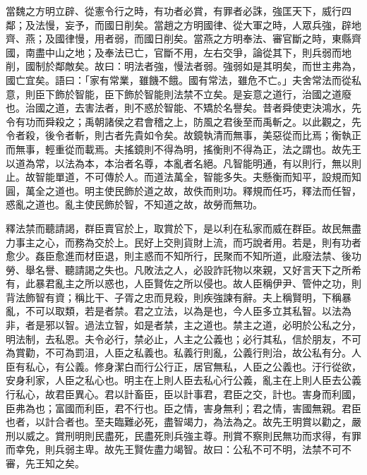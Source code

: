 \begin{pinyinscope}
當魏之方明立辟、從憲令行之時，有功者必賞，有罪者必誅，強匡天下，威行四鄰；及法慢，妄予，而國日削矣。當趙之方明國律、從大軍之時，人眾兵強，辟地齊、燕；及國律慢，用者弱，而國日削矣。當燕之方明奉法、審官斷之時，東縣齊國，南盡中山之地；及奉法已亡，官斷不用，左右交爭，論從其下，則兵弱而地削，國制於鄰敵矣。故曰：明法者強，慢法者弱。強弱如是其明矣，而世主弗為，國亡宜矣。語曰：「家有常業，雖饑不餓。國有常法，雖危不亡。」夫舍常法而從私意，則臣下飾於智能，臣下飾於智能則法禁不立矣。是妄意之道行，治國之道廢也。治國之道，去害法者，則不惑於智能、不矯於名譽矣。昔者舜使吏決鴻水，先令有功而舜殺之；禹朝諸侯之君會稽之上，防風之君後至而禹斬之。以此觀之，先令者殺，後令者斬，則古者先貴如令矣。故鏡執清而無事，美惡從而比焉；衡執正而無事，輕重從而載焉。夫搖鏡則不得為明，搖衡則不得為正，法之謂也。故先王以道為常，以法為本，本治者名尊，本亂者名絕。凡智能明通，有以則行，無以則止。故智能單道，不可傳於人。而道法萬全，智能多失。夫懸衡而知平，設規而知圓，萬全之道也。明主使民飾於道之故，故佚而則功。釋規而任巧，釋法而任智，惑亂之道也。亂主使民飾於智，不知道之故，故勞而無功。

釋法禁而聽請謁，群臣賣官於上，取賞於下，是以利在私家而威在群臣。故民無盡力事主之心，而務為交於上。民好上交則貨財上流，而巧說者用。若是，則有功者愈少。姦臣愈進而材臣退，則主惑而不知所行，民聚而不知所道，此廢法禁、後功勞、舉名譽、聽請謁之失也。凡敗法之人，必設詐託物以來親，又好言天下之所希有，此暴君亂主之所以惑也，人臣賢佐之所以侵也。故人臣稱伊尹、管仲之功，則背法飾智有資；稱比干、子胥之忠而見殺，則疾強諫有辭。夫上稱賢明，下稱暴亂，不可以取類，若是者禁。君之立法，以為是也，今人臣多立其私智。以法為非，者是邪以智。過法立智，如是者禁，主之道也。禁主之道，必明於公私之分，明法制，去私恩。夫令必行，禁必止，人主之公義也；必行其私，信於朋友，不可為賞勸，不可為罰沮，人臣之私義也。私義行則亂，公義行則治，故公私有分。人臣有私心，有公義。修身潔白而行公行正，居官無私，人臣之公義也。汙行從欲，安身利家，人臣之私心也。明主在上則人臣去私心行公義，亂主在上則人臣去公義行私心，故君臣異心。君以計畜臣，臣以計事君，君臣之交，計也。害身而利國，臣弗為也；富國而利臣，君不行也。臣之情，害身無利；君之情，害國無親。君臣也者，以計合者也。至夫臨難必死，盡智竭力，為法為之。故先王明賞以勸之，嚴刑以威之。賞刑明則民盡死，民盡死則兵強主尊。刑賞不察則民無功而求得，有罪而幸免，則兵弱主卑。故先王賢佐盡力竭智。故曰：公私不可不明，法禁不可不審，先王知之矣。


\end{pinyinscope}